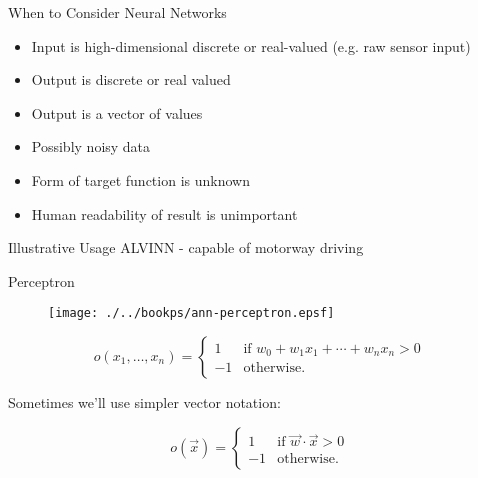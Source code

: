 \documentclass[%
pdf,
colorBG,
slideColor,
tcrico,
]{prosper}
\begin{document}
\begin{slide}{When to Consider Neural Networks  } 
	\begin{itemize}
	\item Input is high-dimensional discrete or real-valued (e.g. raw sensor input)
	\item Output is discrete or real valued
	\item Output is a vector of values
	\item Possibly noisy data
	\item Form of target function is unknown 
	\item Human readability of result is unimportant
	\end{itemize}
\end{slide}

\begin{slide}{Illustrative Usage} 
ALVINN - capable of motorway driving 
\begin{figure}
	\centering
\end{figure}
\end{slide}



\begin{slide}{  Perceptron  } 
\begin{figure}
	\centering
	\texttt{[image: ./../bookps/ann-perceptron.epsf]}
\end{figure}

\tiny

\[o(x_{1}, \ldots, x_{n}) = \left\{ \begin{array}{rl}
     1 & \mbox{if $w_{0} + w_{1}x_1 + \cdots + w_n x_n > 0$}\\
     -1 & \mbox{otherwise.}  
\end{array}
\right. \]

Sometimes we'll use simpler vector notation:

\[o(\vec{x}) = \left\{ \begin{array}{rl}
     1 & \mbox{if $\vec{w} \cdot \vec{x} > 0$}\\
     -1 & \mbox{otherwise.}  
\end{array}
\right. \]
\end{slide}
\end{document}
